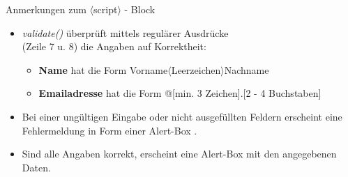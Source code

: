 \documentclass{beamer}
\begin{document}
\begin{frame}{Anmerkungen zum $\langle$script$\rangle$ - Block}
\small{
\begin{itemize}
\item {\it validate()} überprüft mittels regulärer Ausdrücke\\ (Zeile 7 u. 8) die Angaben auf Korrektheit:
	\begin{itemize}
	\item {\bf Name} hat die Form Vorname$\langle$Leerzeichen$\rangle$Nachname
	\item {\bf Emailadresse} hat die Form @[min. 3 Zeichen].[2 - 4 Buchstaben]
	\end{itemize}
\item Bei einer ungültigen Eingabe oder nicht ausgefüllten Feldern erscheint eine Fehlermeldung in Form einer Alert-Box .
\item Sind alle Angaben korrekt, erscheint eine Alert-Box mit den angegebenen Daten.
\end{itemize}}
\end{frame}
\end{document}
